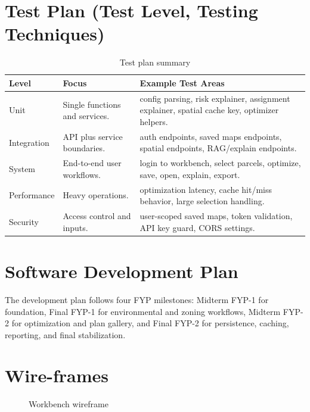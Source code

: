 \documentclass[12pt,a4paper,oneside]{report}
\begin{document}
\section{Test Plan (Test Level, Testing Techniques)}
\begin{longtable}{p{}p{}p{}}
\caption{Test plan summary}\label{tab:testplan}\\
\toprule
Level & Focus & Example Test Areas \\
\midrule
Unit & Single functions and services. & config parsing, risk explainer, assignment explainer, spatial cache key, optimizer helpers. \\
Integration & API plus service boundaries. & auth endpoints, saved maps endpoints, spatial endpoints, RAG/explain endpoints. \\
System & End-to-end user workflows. & login to workbench, select parcels, optimize, save, open, explain, export. \\
Performance & Heavy operations. & optimization latency, cache hit/miss behavior, large selection handling. \\
Security & Access control and inputs. & user-scoped saved maps, token validation, API key guard, CORS settings. \\
\bottomrule
\end{longtable}

\section{Software Development Plan}
The development plan follows four FYP milestones: Midterm FYP-1 for foundation, Final FYP-1 for environmental and zoning workflows, Midterm FYP-2 for optimization and plan gallery, and Final FYP-2 for persistence, caching, reporting, and final stabilization.

\section{Wire-frames}
\begin{figure}[H]\centering
{}
\caption{Workbench wireframe}\end{figure}
\end{document}
